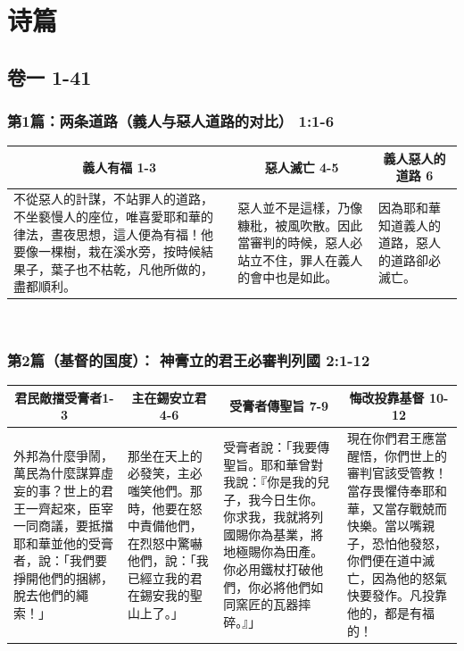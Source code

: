 
\chapter{诗篇}
\section{卷一 1-41}
\subsection{第1篇：两条道路（義人与惡人道路的对比） 1:1-6}
\begin{table}[H]
\centering
\begin{tabular}{p{}|p{4.500cm}|p{2.7500cm}}\hline\hline
\multicolumn{1}{c|}{義人有福 1-3}&\multicolumn{1}{c|}{惡人滅亡 4-5}&\multicolumn{1}{c}{義人惡人的道路 6}\\\hline
不從惡人的計謀，不站罪人的道路，不坐褻慢人的座位，唯喜愛耶和華的律法，晝夜思想，這人便為有福！他要像一棵樹，栽在溪水旁，按時候結果子，葉子也不枯乾，凡他所做的，盡都順利。
&惡人並不是這樣，乃像糠秕，被風吹散。因此當審判的時候，惡人必站立不住，罪人在義人的會中也是如此。
&因為耶和華知道義人的道路，惡人的道路卻必滅亡。\\\hline
\end{tabular}
\end{table} 


\subsection{第2篇（基督的国度）： 神膏立的君王必審判列國 2:1-12}
\begin{table}[H]
\centering
\begin{tabular}{p{3.75cm}|p{2.9cm}|p{4.7500cm}|p{4.7500cm}}\hline\hline
\multicolumn{1}{c|}{君民敵擋受膏者1-3}&\multicolumn{1}{c|}{主在錫安立君4-6}&\multicolumn{1}{c}{受膏者傳聖旨 7-9}&\multicolumn{1}{c}{悔改投靠基督 10-12}\\\hline
外邦為什麼爭鬧，萬民為什麼謀算虛妄的事？世上的君王一齊起來，臣宰一同商議，要抵擋耶和華並他的受膏者，說：「我們要掙開他們的捆綁，脫去他們的繩索！」
&那坐在天上的必發笑，主必嗤笑他們。那時，他要在怒中責備他們，在烈怒中驚嚇他們，說：「我已經立我的君在錫安我的聖山上了。」
&受膏者說：「我要傳聖旨。耶和華曾對我說：『你是我的兒子，我今日生你。你求我，我就將列國賜你為基業，將地極賜你為田產。你必用鐵杖打破他們，你必將他們如同窯匠的瓦器摔碎。』」
&現在你們君王應當醒悟，你們世上的審判官該受管教！當存畏懼侍奉耶和華，又當存戰兢而快樂。當以嘴親子，恐怕他發怒，你們便在道中滅亡，因為他的怒氣快要發作。凡投靠他的，都是有福的！\\\hline
\end{tabular}
\end{table} 


